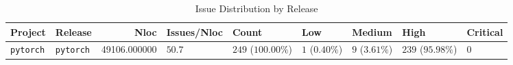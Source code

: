 \begin{table}
\caption{Issue Distribution by Release}
\label{tab:issue-release-distribution}
\begin{tabular}{llrllllll}
\toprule
Project & Release & Nloc & Issues/Nloc & Count & Low & Medium & High & Critical \\
\midrule
\texttt{pytorch} & \texttt{pytorch} & 49106.000000 & $50.7$ & $249$ ($100.00\%$) & $1$ ($0.40\%$) & $9$ ($3.61\%$) & $239$ ($95.98\%$) & $0$ \\
\bottomrule
\end{tabular}
\end{table}
